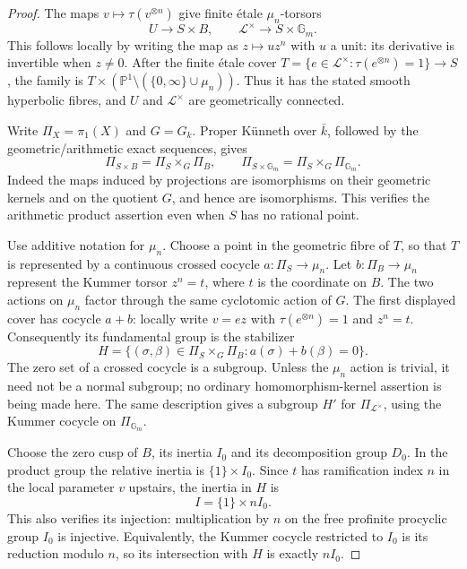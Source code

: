 \begin{proof}
The maps $v\mapsto\tau(v^{\otimes n})$ give finite \'etale
$\mu_n$-torsors
\[
 U\longrightarrow S\times B,\qquad
 \mathcal L^\times\longrightarrow S\times\mathbb G_m.
\]
This follows locally by writing the map as $z\mapsto u z^n$ with
$u$ a unit: its derivative is invertible when $z\ne0$.
After the finite \'etale cover
$T=\{e\in\mathcal L^\times:\tau(e^{\otimes n})=1\}\to S$,
the family is
$T\times(\mathbb P^1\setminus(\{0,\infty\}\cup\mu_n))$.
Thus it has the stated smooth hyperbolic fibres, and $U$ and
$\mathcal L^\times$ are geometrically connected.

Write $\Pi_X=\pi_1(X)$ and $G=G_k$.
Proper K\"unneth over $\bar k$, followed by the geometric/arithmetic
exact sequences, gives
\[
 \Pi_{S\times B}=\Pi_S\times_G\Pi_B,\qquad
 \Pi_{S\times\mathbb G_m}=\Pi_S\times_G\Pi_{\mathbb G_m}.
\]
Indeed the maps induced by projections are isomorphisms on their
geometric kernels and on the quotient $G$, and hence are
isomorphisms. This verifies the arithmetic product assertion even
when $S$ has no rational point.

Use additive notation for $\mu_n$. Choose a point in the geometric
fibre of $T$, so that $T$ is represented by a continuous crossed
cocycle $a:\Pi_S\to\mu_n$. Let
$b:\Pi_B\to\mu_n$ represent the Kummer torsor $z^n=t$, where
$t$ is the coordinate on $B$. The two actions on $\mu_n$ factor
through the same cyclotomic action of $G$. The first displayed
cover has cocycle $a+b$: locally write $v=e z$ with
$\tau(e^{\otimes n})=1$ and $z^n=t$. Consequently its fundamental
group is the stabilizer
\begin{equation}\label{eq:ag-cyclic-stabilizer}
 H=\{(\sigma,\beta)\in\Pi_S\times_G\Pi_B:
                 a(\sigma)+b(\beta)=0\}.
\end{equation}
The zero set of a crossed cocycle is a subgroup. Unless the
$\mu_n$ action is trivial, it need not be a normal subgroup; no
ordinary homomorphism-kernel assertion is being made here.
The same description gives a subgroup $H'$ for
$\Pi_{\mathcal L^\times}$, using the Kummer cocycle on
$\Pi_{\mathbb G_m}$.

Choose the zero cusp of $B$, its inertia $I_0$ and its
decomposition group $D_0$. In the product group the relative
inertia is $\{1\}\times I_0$. Since $t$ has ramification index
$n$ in the local parameter $v$ upstairs, the inertia in $H$ is
\[
 I=\{1\}\times nI_0.
\]
This also verifies its injection: multiplication by $n$ on the
free profinite procyclic group $I_0$ is injective. Equivalently,
the Kummer cocycle restricted to $I_0$ is its reduction modulo
$n$, so its intersection with $H$ is exactly $nI_0$.


\end{proof}
